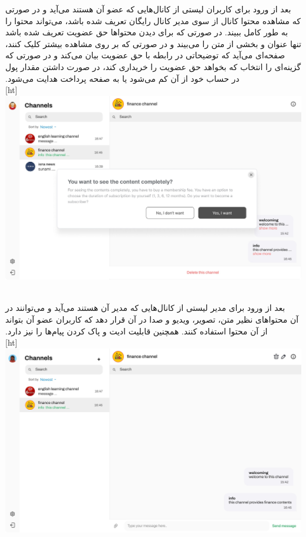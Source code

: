 ‫
‫بعد از ورود برای کاربران لیستی از کانال‌هایی که عضو آن هستند می‌آید و در صورتی که مشاهده محتوا کانال از سوی مدیر کانال رایگان تعریف شده باشد، می‌تواند محتوا را به طور کامل ببیند. در صورتی که برای دیدن محتوا‌ها حق عضویت تعریف شده باشد تنها عنوان و بخشی از متن را می‌بیند و در صورتی که بر روی مشاهده بیشتر کلیک کنند، صفحه‌ای می‌آید که توضیحاتی در رابطه با حق عضویت بیان می‌کند و در صورتی که گزینه‌ای را انتخاب که بخواهد حق عضویت را خریداری کند، در صورت داشتن مقدار پول در حساب خود از آن کم می‌شود یا به صفحه پرداخت هدایت می‌شود.
‫\\
‫[ht]
\includegraphics[scale=0.2]{figs/user_channel_page.jpeg}
‫
‫
‫
‫\FloatBarrier

\clearpage
‫
‫
‫بعد از ورود برای مدیر لیستی از کانال‌هایی که مدیر آن هستند می‌آید و می‌توانند در آن محتوا‌های نظیر متن، تصویر، ویدیو و صدا در آن قرار دهد که کاربران عضو آن بتواند از آن محتوا استفاده کنند. همچنین قابلیت ادیت و پاک کردن پیام‌ها را نیز دارد.
‫\\
‫‫[ht]
\includegraphics[scale=0.2]{figs/admin_channel_page.jpeg}
‫
‫
‫
‫ \FloatBarrier
\clearpage

